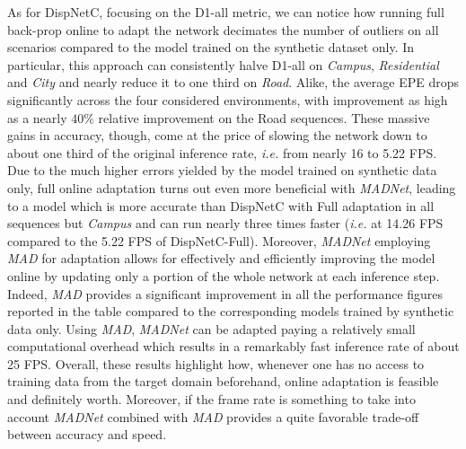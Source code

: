 \documentclass[10pt,twocolumn,letterpaper]{article}
\def\ie{\emph{i.e.}}
\def\netname{\emph{MADNet}}
\def\algoname{\emph{MAD}}
\begin{document}
As for DispNetC, focusing on the D1-all metric, we can notice how running full back-prop online to adapt the network decimates the number of outliers on all scenarios compared to the model trained on the synthetic dataset only. In particular, this approach can consistently halve D1-all on \emph{Campus}, \emph{Residential} and \emph{City} and nearly reduce it to one third on \emph{Road}. Alike, the average EPE drops significantly across the four considered environments, with improvement as high as a nearly $40\%$ relative improvement on the Road sequences. These massive gains in accuracy, though, come at the price of slowing the network down to about one third of the original inference rate, \ie{} from nearly 16 to 5.22 FPS. Due to the much higher errors yielded by the model trained on synthetic data only, full online adaptation turns out even more beneficial with \netname{}, leading to a model which is more accurate than DispNetC with Full adaptation in all sequences but \textit{Campus} and can run nearly three times faster (\ie{} at 14.26 FPS compared to the 5.22 FPS of DispNetC-Full). Moreover, \netname{} employing \algoname{} for adaptation allows for effectively and efficiently improving the model online by updating only a portion of the whole network at each inference step. Indeed, \algoname{} provides a significant improvement in all the performance figures reported in the table compared to the corresponding models trained by synthetic data only. 
Using \algoname{},  \netname{}  can be adapted paying a relatively small computational overhead which results in a remarkably fast inference rate of about 25 FPS. Overall, these results highlight how, whenever one has no access to training data from the target domain beforehand, online adaptation is feasible and definitely worth. Moreover, if the frame rate is something to take into account \netname{} combined with \algoname{} provides a quite favorable trade-off between accuracy and speed.       

\end{document}
